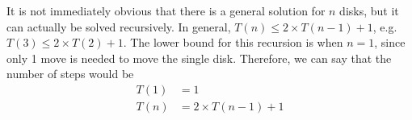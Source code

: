 It is not immediately obvious that there is a general solution for $n$ disks, but it can actually be solved recursively.
 In general, $T(n) \leq 2 \times T(n - 1) + 1$, e.g. $T(3) \leq 2 \times T(2) + 1$. The lower bound for this recursion
 is when $n = 1$, since only 1 move is needed to move the single disk. Therefore, we can say that the number of steps
 would be
\begin{align*}
  T(1) &= 1\\
  T(n) &= 2 \times T(n - 1) + 1
\end{align*}



